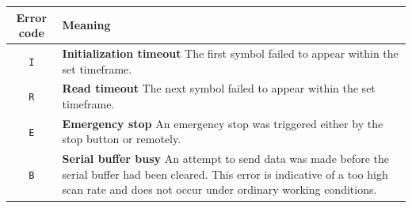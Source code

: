 \documentclass{article}
\begin{document}
	\begin{center}
	\begin{tabular}{ |c|p{9cm}| }
		\hline
			Error code & Meaning \\
		\hline
			\texttt{I} &
			\textbf{Initialization timeout}\newline
			The first symbol failed to appear within the set timeframe. \\
		\hline
			\texttt{R} &
			\textbf{Read timeout}\newline
			The next symbol failed to appear within the set timeframe. \\
		\hline
			\texttt{E} &
			\textbf{Emergency stop}\newline
			An emergency stop was triggered either by the stop button or
			remotely. \\
		\hline
			\texttt{B} &
			\textbf{Serial buffer busy}\newline
			An attempt to send data was made before the serial buffer had been
			cleared. This error is indicative of a too high scan rate and does
			not occur under ordinary working conditions.\\
		\hline
		\end{tabular}
	\end{center}
	
\end{document}
